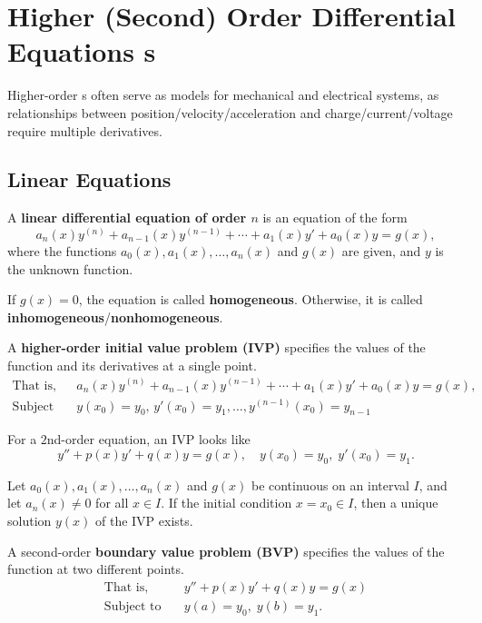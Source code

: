 \chapter{Higher (Second) Order Differential Equations \ode{}s}
Higher-order \ode{}s often serve as models for mechanical and electrical systems, as 
relationships between position/velocity/acceleration and charge/current/voltage require multiple derivatives.

\section{Linear Equations}
A \textbf{linear differential equation of order $n$} is an equation of the form
\[
a_n(x) y^{(n)} + a_{n-1}(x) y^{(n-1)} + \cdots + a_1(x) y' + a_0(x) y = g(x),
\]
where the functions $a_0(x), a_1(x), \dots, a_n(x)$ and $g(x)$ are given, and $y$ is the unknown function.

If $g(x)=0$, the equation is called \textbf{homogeneous}. Otherwise, it is called \textbf{inhomogeneous}/\textbf{nonhomogeneous}.


\begin{definition}
  A \textbf{higher-order initial value problem (IVP)} specifies the values of the function and its derivatives at a single point.
  \begin{align*}
    \text{That is, } \quad & a_n(x) y^{(n)} + a_{n-1}(x) y^{(n-1)} + \cdots + a_1(x) y' + a_0(x) y = g(x),\\
    \text{Subject to} \quad & y(x_0) = y_0, \, y'(x_0) = y_1, \ldots, y^{(n-1)}(x_0)=y_{n-1}
  \end{align*}
\end{definition}


For a $2$nd-order equation, an IVP looks like
\[
y'' + p(x)y' + q(x)y = g(x), \quad y(x_0)=y_0, \; y'(x_0)=y_1.
\]

\begin{theorem}
  Let $a_0(x), a_1(x), \dots, a_n(x)$ and $g(x)$ be continuous on an interval \(I\), and let \(a_n(x)\neq 0\) for all \(x\in I\).
  If the initial condition \(x=x_0 \in I\), then a unique solution \(y(x)\) of the IVP exists.
\end{theorem}


\begin{definition}
  A second-order \textbf{boundary value problem (BVP)} specifies the values of the function at two different points.
  \begin{align*}
    \text{That is,} \quad&  y'' + p(x)y' + q(x)y = g(x)\\
    \text{Subject to} \quad& y(a)=y_0, \; y(b)=y_1.
  \end{align*}
\end{definition}


